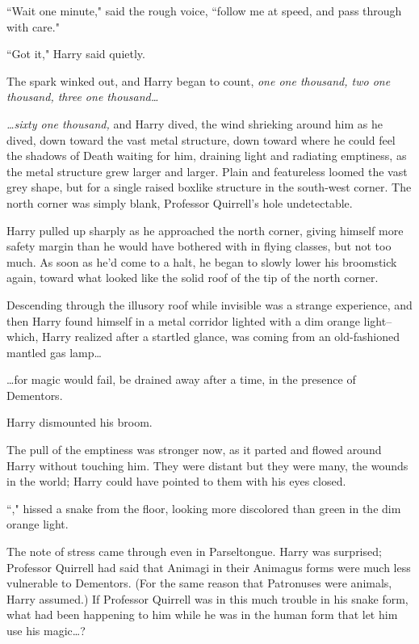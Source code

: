 ``Wait one minute," said the rough voice, ``follow me at speed, and pass through with care."

``Got it," Harry said quietly.

The spark winked out, and Harry began to count, \emph{one one thousand, two one thousand, three one thousand{\ldots}}

\emph{{\ldots}sixty one thousand,} and Harry dived, the wind shrieking around him as he dived, down toward the vast metal structure, down toward where he could feel the shadows of Death waiting for him, draining light and radiating emptiness, as the metal structure grew larger and larger. Plain and featureless loomed the vast grey shape, but for a single raised boxlike structure in the south-west corner. The north corner was simply blank, Professor Quirrell's hole undetectable.

Harry pulled up sharply as he approached the north corner, giving himself more safety margin than he would have bothered with in flying classes, but not too much. As soon as he'd come to a halt, he began to slowly lower his broomstick again, toward what looked like the solid roof of the tip of the north corner.

Descending through the illusory roof while invisible was a strange experience, and then Harry found himself in a metal corridor lighted with a dim orange light\---which, Harry realized after a startled glance, was coming from an old-fashioned mantled gas lamp{\ldots}

{\ldots}for magic would fail, be drained away after a time, in the presence of Dementors.

Harry dismounted his broom.

The pull of the emptiness was stronger now, as it parted and flowed around Harry without touching him. They were distant but they were many, the wounds in the world; Harry could have pointed to them with his eyes closed.

``," hissed a snake from the floor, looking more discolored than green in the dim orange light.

The note of stress came through even in Parseltongue. Harry was surprised; Professor Quirrell had said that Animagi in their Animagus forms were much less vulnerable to Dementors. (For the same reason that Patronuses were animals, Harry assumed.) If Professor Quirrell was in this much trouble in his snake form, what had been happening to him while he was in the human form that let him use his magic{\ldots}?


